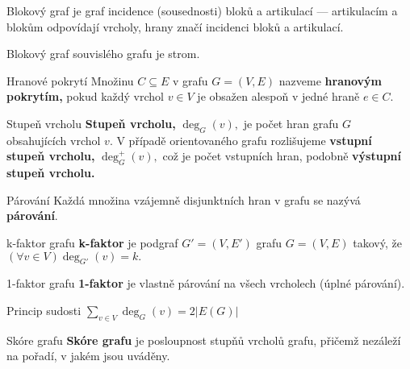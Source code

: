 \begin{definiceN}{Blokový graf}
je graf incidence (sousednosti) bloků a artikulací --- artikulacím a blokům odpovídají vrcholy, hrany značí incidenci bloků a artikulací.
\end{definiceN}

\begin{veta}
Blokový graf souvislého grafu je strom.
\end{veta}

\begin{definiceN}{Hranové pokrytí}
Množinu $C \subseteq E$ v grafu $G=(V,E)$ nazveme \textbf{hranovým pokrytím,} pokud každý vrchol $v \in V$ je obsažen alespoň v jedné hraně $e \in C.$
\end{definiceN}

\begin{definiceN}{Stupeň vrcholu}
\textbf{Stupeň vrcholu,} $\deg_{G}(v),$ je počet hran grafu $G$ obsahujících vrchol $v.$ V případě orientovaného grafu rozlišujeme \textbf{vstupní stupeň vrcholu,} $\deg^+_G(v),$ což je počet vstupních hran, podobně \textbf{výstupní stupeň vrcholu.}
\end{definiceN}

\begin{definiceN}{Párování}
Každá množina vzájemně disjunktních hran v grafu se nazývá \textbf{párování}.
\end{definiceN}

\begin{definiceN}{k-faktor grafu}
\textbf{k-faktor} je podgraf $G'=(V,E')$ grafu $G=(V,E)$ takový, že $(\forall v \in V) \deg_{G'}(v)=k.$
\end{definiceN}

\begin{poznamkaN}{1-faktor grafu}
\textbf{1-faktor} je vlastně párování na všech vrcholech (úplné párování).
\end{poznamkaN}

\begin{vetaN}{Princip sudosti}
$\sum_{v \in V} \deg_G(v) = 2 |E(G)|$ \end{vetaN}

\begin{definiceN}{Skóre grafu}
\textbf{Skóre grafu} je posloupnost stupňů vrcholů grafu, přičemž nezáleží na pořadí, v jakém jsou uváděny.
\end{definiceN}

